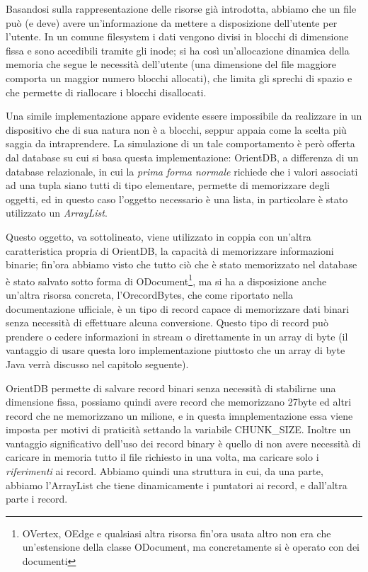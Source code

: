 Basandosi sulla rappresentazione delle risorse già introdotta, abbiamo che un file può (e deve) avere un'informazione da mettere a disposizione dell'utente per l'utente. In un comune filesystem i dati vengono divisi in blocchi di dimensione fissa e sono accedibili tramite gli inode; si ha così un'allocazione dinamica della memoria che segue le necessità dell'utente (una dimensione del file maggiore comporta un maggior numero blocchi allocati), che limita gli sprechi di spazio e che permette di riallocare i blocchi disallocati.

Una simile implementazione appare evidente essere impossibile da realizzare in un dispositivo che di sua natura non è a blocchi, seppur appaia come la scelta più saggia da intraprendere. La simulazione di un tale comportamento è però offerta dal database su cui si basa questa implementazione: OrientDB, a differenza di un database relazionale, in cui la \emph{prima forma normale} richiede che i valori associati ad una tupla siano tutti di tipo elementare, permette di memorizzare degli oggetti, ed in questo caso l'oggetto necessario è una lista, in particolare è stato utilizzato un \emph{ArrayList}.

Questo oggetto, va sottolineato, viene utilizzato in coppia con un'altra caratteristica propria di OrientDB, la capacità di memorizzare informazioni binarie; fin'ora abbiamo visto che tutto ciò che è stato memorizzato nel database è stato salvato sotto forma di  ODocument\footnote{OVertex, OEdge e qualsiasi altra risorsa fin'ora usata altro non era che un'estensione della classe ODocument, ma concretamente si è operato con dei documenti}, ma si ha a disposizione anche un'altra risorsa concreta, l'OrecordBytes, che come riportato nella documentazione ufficiale, è un tipo di record capace di memorizzare dati binari senza necessità di effettuare alcuna conversione. Questo tipo di record può prendere o cedere informazioni in stream o direttamente in un array di byte (il vantaggio di usare questa loro implementazione piuttosto che un array di byte Java verrà discusso nel capitolo seguente).

OrientDB permette di salvare record binari senza necessità di stabilirne una dimensione fissa, possiamo quindi avere record che memorizzano 27byte ed altri record che ne memorizzano un milione, e in questa imnplementazione essa viene imposta per motivi di praticità settando la variabile CHUNK\_SIZE. Inoltre un vantaggio significativo dell'uso dei record binary è quello di non avere necessità di caricare in memoria tutto il file richiesto in una volta, ma caricare solo i \emph{riferimenti} ai record. Abbiamo quindi una struttura in cui, da una parte, abbiamo l'ArrayList che tiene dinamicamente i puntatori ai record, e dall'altra parte i record.

